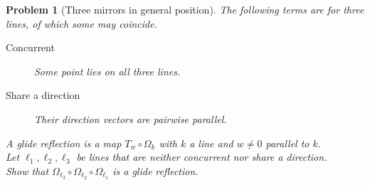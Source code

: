 \documentclass[11pt,a4paper]{article}
\theoremstyle{boxed}
\newtheorem{problem}{Problem}
\theoremstyle{definition}
\begin{document}
\begin{problem}[Three mirrors in general position]\label{p:general}
The following terms are for three lines, of which some may coincide.
\begin{description}
    \item[Concurrent] Some point lies on all three lines.
    \item[Share a direction] Their direction vectors are pairwise parallel.
\end{description}
A glide reflection is a map $T_w\circ\Omega_k$ with $k$ a line and $w\neq0$ parallel to $k$.\\
Let $\ell_1,\ell_2,\ell_3$ be lines that are neither concurrent nor share a direction.\\
Show that $\Omega_{\ell_3}\circ\Omega_{\ell_2}\circ\Omega_{\ell_1}$ is a glide reflection.
\end{problem}
\end{document}
